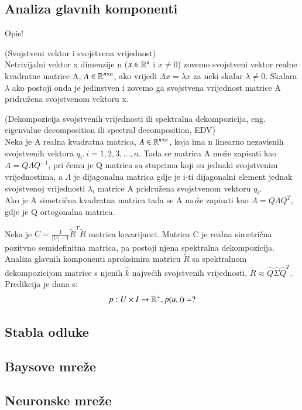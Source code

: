 \documentclass[a4paper,oneside,12pt]{memoir} %
\begin{document}
\subsection{Analiza glavnih komponenti}
Opis!
\begin{defn} (Svojstveni vektor i svojstvena vrijednost)
\\Netrivijalni vektor x dimenzije n ($x\in \mathbb{R}^n$ i $x\neq 0$) zovemo svojstveni vektor realne kvadratne matrice A, $A\in \mathbb{R}^{n\times n}$, ako vrijedi $Ax=\lambda x$ za neki skalar $\lambda \neq 0$. Skalara $\lambda$ ako postoji onda je jedinstven i zovemo ga svojstvena vrijednost matrice A pridružena svojstvenom vektoru x. 
\end{defn}
\begin{defn} (Dekompozicija svojstvenih vrijednosti ili spektralna dekompozicija, eng. eigenvalue decomposition ili spectral decomposition, EDV)
\\Neka je A realna kvadratna matrica, $A\in \mathbb{R}^{n\times n}$, koja ima n linearno nezavisnih svojstvenih vektora $q_i,  i = 1,2,3,...,n.$ Tada se matrica A može zapisati kao $A=Q\Lambda Q^{-1}$, pri čemu je Q matrica sa stupcima koji su jednaki svojstvenim vrijednostima, a $\Lambda$ je dijagonalna matrica gdje je i-ti dijagonalni element jednak svojstvenoj vrijednosti $\lambda_i$ matrice A pridružena svojstvenom vektoru $q_i$.
\\ Ako je A simetrična kvadratna matrica tada se A može zapisati kao $A=Q\Lambda Q^{T}$, gdje je Q ortogonalna matrica.
\end{defn}
\begin{defn}
Neka je $C=\frac{1}{|U|-1}\tilde{R}^T\tilde{R}$ matrica kovarijanci. Matrica C je realna simetrična pozitvno semidefinitna matrica, pa postoji njena spektralna dekompozicija. Analiza glavnih komponenti aproksimira matricu $\tilde{R}$ sa spektralnom dekompozicijom matrice s njenih $\hat{k}$ najvećih svojstvenih vrijednosti, $\tilde{R}\approx \hat{Q}\hat{\Sigma}\hat{Q}^T$. Predikcija je dana s:
\[ p:U\times I \rightarrow \mathbb{R}^+, p(u,i) = ? \]
\end{defn}
%
\subsection{Stabla odluke}
%
\subsection{Baysove mreže}
%
\subsection{Neuronske mreže}
%
\end{document}
